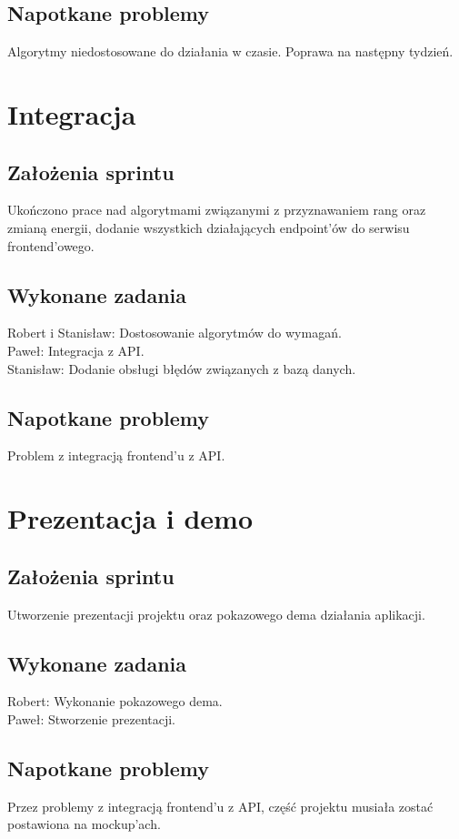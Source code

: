 \documentclass[a4paper,11pt]{report}
\begin{document}
\subsection {Napotkane problemy}
Algorytmy niedostosowane do działania w czasie. Poprawa na następny tydzień.

\section {Integracja}
\subsection {Założenia sprintu}
Ukończono prace nad algorytmami związanymi z przyznawaniem rang oraz zmianą energii, dodanie wszystkich działających endpoint’ów do serwisu frontend'owego.
\subsection {Wykonane zadania}
Robert i Stanisław: Dostosowanie algorytmów do wymagań. \\
Paweł: Integracja z API.\\
Stanisław: Dodanie obsługi błędów związanych z bazą danych. \\
\subsection {Napotkane problemy}
Problem z integracją frontend'u z API.

\section {Prezentacja i demo}
\subsection {Założenia sprintu}
Utworzenie prezentacji projektu oraz pokazowego dema działania aplikacji.
\subsection {Wykonane zadania}
Robert: Wykonanie pokazowego dema. \\
Paweł: Stworzenie prezentacji.\\
\subsection {Napotkane problemy}
Przez problemy z integracją frontend'u z API, część projektu musiała zostać postawiona na mockup'ach.
\end{document}
